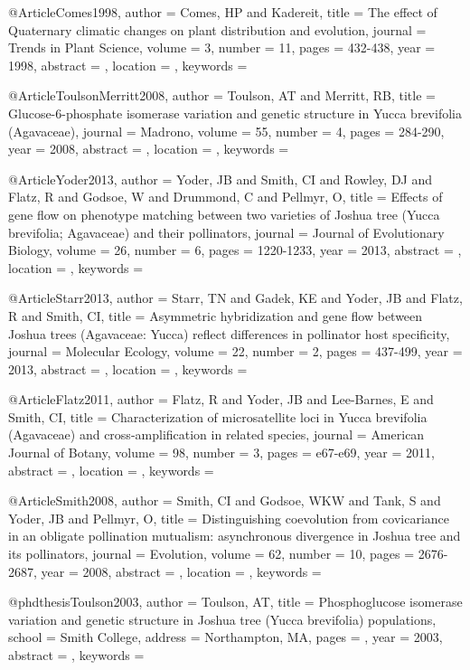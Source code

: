 @Article{Comes1998,
author = {Comes, HP and Kadereit}, 
title = {The effect of Quaternary climatic changes on plant distribution and evolution}, 
journal = {Trends in Plant Science}, 
volume = {3}, 
number = {11}, 
pages = {432-438}, 
year = {1998}, 
abstract = {}, 
location = {}, 
keywords = {}}


@Article{ToulsonMerritt2008,
author = {Toulson, AT and Merritt, RB}, 
title = {Glucose-6-phosphate isomerase variation and genetic structure in Yucca brevifolia (Agavaceae)}, 
journal = {Madrono}, 
volume = {55}, 
number = {4}, 
pages = {284-290}, 
year = {2008}, 
abstract = {}, 
location = {}, 
keywords = {}}


@Article{Yoder2013,
author = {Yoder, JB and Smith, CI and Rowley, DJ and Flatz, R and Godsoe, W and Drummond, C and Pellmyr, O}, 
title = {Effects of gene flow on phenotype matching between two varieties of Joshua tree (Yucca brevifolia; Agavaceae) and their pollinators}, 
journal = {Journal of Evolutionary Biology}, 
volume = {26}, 
number = {6}, 
pages = {1220-1233}, 
year = {2013}, 
abstract = {}, 
location = {}, 
keywords = {}}


@Article{Starr2013,
author = {Starr, TN and Gadek, KE and Yoder, JB and Flatz, R and Smith, CI}, 
title = {Asymmetric hybridization and gene flow between Joshua trees (Agavaceae: Yucca) reflect differences in pollinator host specificity}, 
journal = {Molecular Ecology}, 
volume = {22}, 
number = {2}, 
pages = {437-499}, 
year = {2013}, 
abstract = {}, 
location = {}, 
keywords = {}}


@Article{Flatz2011,
author = {Flatz, R and Yoder, JB and Lee-Barnes, E and Smith, CI}, 
title = {Characterization of microsatellite loci in Yucca brevifolia (Agavaceae) and cross-amplification in related species}, 
journal = {American Journal of Botany}, 
volume = {98}, 
number = {3}, 
pages = {e67-e69}, 
year = {2011}, 
abstract = {}, 
location = {}, 
keywords = {}}


@Article{Smith2008,
author = {Smith, CI and Godsoe, WKW and Tank, S and Yoder, JB and Pellmyr, O}, 
title = {Distinguishing coevolution from covicariance in an obligate pollination mutualism: asynchronous divergence in Joshua tree and its pollinators}, 
journal = {Evolution}, 
volume = {62}, 
number = {10}, 
pages = {2676-2687}, 
year = {2008}, 
abstract = {}, 
location = {}, 
keywords = {}}


@phdthesis{Toulson2003,
author = {Toulson, AT}, 
title = {Phosphoglucose isomerase variation and genetic structure in Joshua tree (Yucca brevifolia) populations}, 
school = {Smith College}, 
address = {Northampton, MA}, 
pages = {}, 
year = {2003}, 
abstract = {}, 
keywords = {}}


